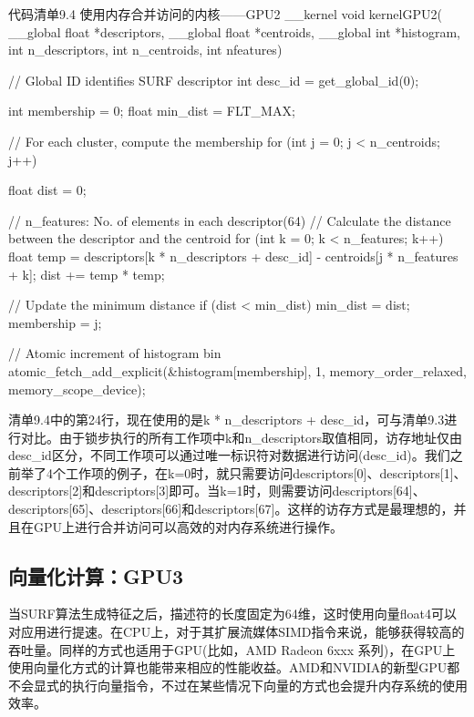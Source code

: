 \begin{codeboxt}[cpp]{代码清单9.4 使用内存合并访问的内核——GPU2}
__kernel
void kernelGPU2(
  __global float *descriptors,
  __global float *centroids,
  __global int *histogram,
  int n_descriptors,
  int n_centroids,
  int nfeatures){

  // Global ID identifies SURF descriptor
  int desc_id = get_global_id(0);

  int membership = 0;
  float min_dist = FLT_MAX;

  // For each cluster, compute the membership
  for (int j = 0; j < n_centroids; j++){
    float dist = 0;

    // n_features: No. of elements in each descriptor(64)
    // Calculate the distance between the descriptor and the centroid
    for (int k = 0; k < n_features; k++){
      float temp = descriptors[k * n_descriptors + desc_id] -
        centroids[j * n_features + k];
      dist += temp * temp;
    }

    // Update the minimum distance
    if (dist < min_dist){
      min_dist = dist;
      membership = j;
    }
  }

  // Atomic increment of histogram bin
  atomic_fetch_add_explicit(&histogram[membership], 1, memory_order_relaxed, memory_scope_device);
}
\end{codeboxt}

清单9.4中的第24行，现在使用的是k * n\_\allowbreak{}descriptors + desc\_\allowbreak{}id，可与清单9.3进行对比。由于锁步执行的所有工作项中k和n\_\allowbreak{}descriptors取值相同，访存地址仅由desc\_\allowbreak{}id区分，不同工作项可以通过唯一标识符对数据进行访问(desc\_\allowbreak{}id)。我们之前举了4个工作项的例子，在k=0时，就只需要访问descriptors[0]、descriptors[1]、descriptors[2]和descriptors[3]即可。当k=1时，则需要访问descriptors[64]、descriptors[65]、descriptors[66]和descriptors[67]。这样的访存方式是最理想的，并且在GPU上进行合并访问可以高效的对内存系统进行操作。

\subsection{向量化计算：GPU3}

当SURF算法生成特征之后，描述符的长度固定为64维，这时使用向量float4可以对应用进行提速。在CPU上，对于其扩展流媒体SIMD指令来说，能够获得较高的吞吐量。同样的方式也适用于GPU(比如，AMD Radeon 6xxx 系列)，在GPU上使用向量化方式的计算也能带来相应的性能收益。AMD和NVIDIA的新型GPU都不会显式的执行向量指令，不过在某些情况下向量的方式也会提升内存系统的使用效率。

